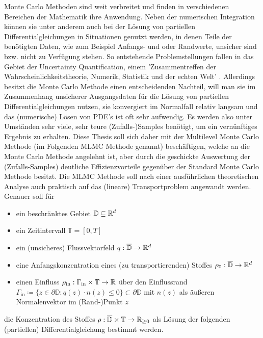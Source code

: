 
Monte Carlo Methoden sind weit verbreitet und finden in verschiedenen Bereichen der Mathematik ihre Anwendung.
Neben der numerischen Integration können sie unter anderem auch bei der Lösung von partiellen Differentialgleichungen in Situationen genutzt werden, in denen Teile der benötigten Daten, wie zum Beispiel Anfangs- und oder Randwerte, unsicher sind bzw. nicht zu Verfügung stehen.
So entstehende Problemstellungen fallen in das Gebiet der Uncertainty Quantification, einem 'Zusammentreffen der Wahrscheinlichkeitstheorie, Numerik, Statistik und der echten Welt' \cite{sullivan2015introduction}.
Allerdings besitzt die Monte Carlo Methode einen entscheidenden Nachteil, will man sie im Zusammenhang unsicherer Ausgangsdaten für die Lösung von partiellen Differentialgleichungen nutzen, sie konvergiert im Normalfall relativ langsam und das (numerische) Lösen von PDE's ist oft sehr aufwendig.
Es werden also unter Umständen sehr viele, sehr teure (Zufalls-)Samples benötigt, um ein vernünftiges Ergebnis zu erhalten. \newline
Diese Thesis soll sich daher mit der Multilevel Monte Carlo Methode (im Folgenden MLMC Methode genannt) beschäftigen, welche an die Monte Carlo Methode angelehnt ist, aber durch die geschickte Auswertung der (Zufalls-Samples) deutliche Effizienzvorteile gegenüber der Standard Monte Carlo Methode besitzt.
Die MLMC Methode soll nach einer ausführlichen theoretischen Analyse auch praktisch auf das (lineare) Transportproblem angewandt werden.
Genauer soll für
\begin{itemize}
	\item ein beschränktes Gebiet $\mathbb{D} \subseteq \mathbb{R}^d$
	\item  ein Zeitintervall $\mathbb{T} = [0,T]$
	\item  ein (unsicheres) Flussvektorfeld $q: \overline{\mathbb{D}} \rightarrow \mathbb{R}^d$
	\item  eine Anfangskonzentration eines (zu transportierenden) Stoffes $\rho_0: \overline{\mathbb{D}} \rightarrow \mathbb{R}^d$
	\item einen Einfluss $\rho_{\text{in}} : \Gamma_{\text{in}} \times \mathbb{T} \rightarrow \mathbb{R}$ über den Einflussrand $\Gamma_{\text{in}} \coloneqq  \{ z \in \partial \mathbb{D}: q(z)\cdot n(z) \leq 0 \} \subset  \partial \mathbb{D}$ mit $n(z)$ als äußeren Normalenvektor im (Rand-)Punkt $z$
\end{itemize}
die Konzentration des Stoffes $\rho: \overline{\mathbb{D}} \times \mathbb{T}  \rightarrow \mathbb{R}_{\geq0}$ als Lösung der folgenden (partiellen) Differentialgleichung bestimmt werden.
